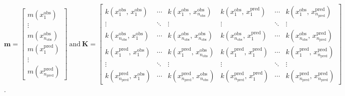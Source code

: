          \(\mathbf{m} = 
         \begin{bmatrix}
            m(x_{1}^{\text{obs}}) \\
            \vdots \\
            m(x_{n_{\text{obs}}}^{\text{obs}}) \\
            m(x_{1}^{\text{pred}}) \\
            \vdots \\
            m(x_{n_{\text{pred}}}^{\text{pred}})
         \end{bmatrix}  
         \: 
         \text{and}
         \:
         \mathbf{K} = 
         \begin{bmatrix}
            k(x_{1}^{\text{obs}}, \, x_{1}^{\text{obs}}) 
            & \cdots 
            & k(x_{1}^{\text{obs}}, \, x_{n_{\text{obs}}}^{\text{obs}}) 
            & k(x_{1}^{\text{obs}}, \, x_{1}^{\text{pred}}) 
            & \cdots 
            & k(x_{1}^{\text{obs}}, \, x_{n_{\text{pred}}}^{\text{pred}}) \\
            
            \vdots & \ddots & \vdots & \vdots & \ddots & \vdots \\
            
            k(x_{n_{\text{obs}}}^{\text{obs}}, \, x_{1}^{\text{obs}}) 
            & \cdots 
            & k(x_{n_{\text{obs}}}^{\text{obs}}, \, x_{n_{\text{obs}}}^{\text{obs}}) 
            & k(x_{n_{\text{obs}}}^{\text{obs}}, \, x_{1}^{\text{pred}}) 
            & \cdots 
            & k(x_{n_{\text{obs}}}^{\text{obs}}, \, x_{n_{\text{pred}}}^{\text{pred}}) \\
            
            k(x_{1}^{\text{pred}}, \, x_{1}^{\text{obs}}) 
            & \cdots 
            & k(x_{1}^{\text{pred}}, \, x_{n_{\text{obs}}}^{\text{obs}}) 
            & k(x_{1}^{\text{pred}}, \, x_{1}^{\text{pred}}) 
            & \cdots 
            & k(x_{1}^{\text{pred}}, \, x_{n_{\text{pred}}}^{\text{pred}}) \\
            
            \vdots & \ddots & \vdots & \vdots & \ddots & \vdots \\
            
            k(x_{n_{\text{pred}}}^{\text{pred}}, \, x_{1}^{\text{obs}}) 
            & \cdots 
            & k(x_{n_{\text{pred}}}^{\text{pred}}, \, x_{n_{\text{obs}}}^{\text{obs}}) 
            & k(x_{n_{\text{pred}}}^{\text{pred}}, \, x_{1}^{\text{pred}}) 
            & \cdots 
            & k(x_{n_{\text{pred}}}^{\text{pred}}, \, x_{n_{\text{pred}}}^{\text{pred}})
         \end{bmatrix}\).

